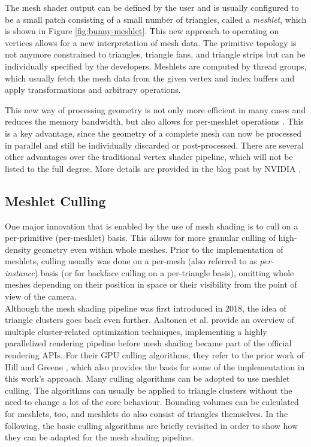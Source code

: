\noindent
The mesh shader output can be defined by the user and is usually configured to be a small patch consisting of a small 
number of triangles, called a \emph{meshlet}, which is shown in Figure \ref{fig:bunny-meshlet}. This new approach 
to operating on vertices allows for a new interpretation of mesh data. The primitive topology is not anymore constrained 
to triangles, triangle fans, and triangle strips but can be individually specified by the developers.
Meshlets are computed by thread groups, which usually fetch the mesh data from the given vertex and index buffers and 
apply transformations and arbitrary operations. \\
\enlargethispage{\baselineskip}

\noindent
This new way of processing geometry is not only more efficient in many cases and reduces the memory bandwidth, but 
also allows for per-meshlet operations \cite{Kubisch2020}. This is a key advantage, since the geometry of a 
complete mesh can now be processed in parallel and still be individually discarded or post-processed. There are 
several other advantages over the traditional vertex shader pipeline, which will not be listed to the full degree. 
More details are provided in the blog post by NVIDIA \cite{Kubisch2020}.\\


\subsection*{Meshlet Culling} \label{subsec-meshlet-culling}

One major innovation that is enabled by the use of mesh shading is to cull on a per-primitive (per-meshlet) basis. 
This allows for more granular culling of high-density geometry even within whole meshes. Prior to the implementation 
of meshlets, culling usually was done on a per-mesh (also referred to as \emph{per-instance}) basis (or for backface 
culling on a per-triangle basis), omitting whole meshes depending on their position in space or their visibility from 
the point of view of the camera.\\

\noindent
Although the mesh shading pipeline was first introduced in 2018, the idea of triangle clusters goes back even further.
Aaltonen et al. \cite{Aaltonen2015} provide an overview of multiple cluster-related optimization techniques, implementing 
a highly parallelized rendering pipeline before mesh shading became part of the official rendering \ac{API}s.
For their \ac{GPU} culling algorithms, they refer to the prior work of Hill \cite{Hill11} and Greene \cite{Greene93}, which 
also provides the basis for some of the implementation in this work's approach. Many culling algorithms can be adopted to 
use meshlet culling. The algorithms can usually be applied to triangle clusters without the need to change a lot of the 
core behaviour. Bounding volumes can be calculated for meshlets, too, and meshlets do also 
consist of triangles themselves. In the following, the basic culling algorithms are briefly revisited in order to show how they 
can be adapted for the mesh shading pipeline.


